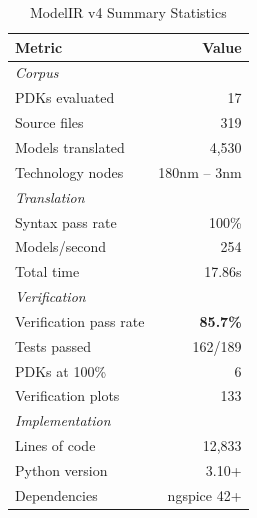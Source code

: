 \documentclass[conference]{IEEEtran}
\begin{document}
\begin{table}[!t]
\caption{ModelIR v4 Summary Statistics}
\label{tab:summary}
\centering
\renewcommand{\arraystretch}{1.2}
\begin{tabular}{@{}lr@{}}
\toprule
\textbf{Metric} & \textbf{Value} \\
\midrule
\multicolumn{2}{l}{\textit{Corpus}} \\
PDKs evaluated & 17 \\
Source files & 319 \\
Models translated & 4,530 \\
Technology nodes & 180nm -- 3nm \\
\midrule
\multicolumn{2}{l}{\textit{Translation}} \\
Syntax pass rate & 100\% \\
Models/second & 254 \\
Total time & 17.86s \\
\midrule
\multicolumn{2}{l}{\textit{Verification}} \\
Verification pass rate & \textbf{85.7\%} \\
Tests passed & 162/189 \\
PDKs at 100\% & 6 \\
Verification plots & 133 \\
\midrule
\multicolumn{2}{l}{\textit{Implementation}} \\
Lines of code & 12,833 \\
Python version & 3.10+ \\
Dependencies & ngspice 42+ \\
\bottomrule
\end{tabular}
\end{table}
\end{document}
